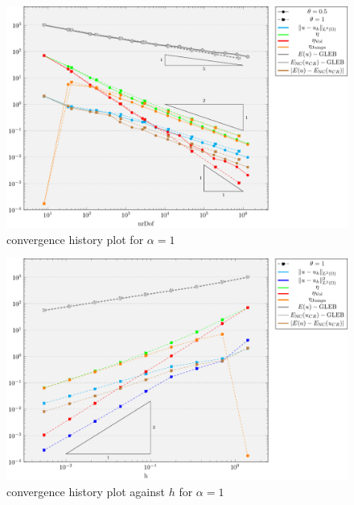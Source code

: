 \documentclass[draft=false,twoside,12pt]{scrreprt}
\begin{document}
\vspace{-\parskip}
\begin{figure}[H]
	\centering
	\includegraphics[width=16.5cm]{tikzPlots/f01/alpha1/convergence.pdf}
  \caption{convergence history plot for $\alpha=1$}
\end{figure}

\vspace{-\parskip}
\begin{figure}[H]
	\centering
	\includegraphics[width=16.5cm]{tikzPlots/f01/alpha1hMax/convergence.pdf}
  \caption{convergence history plot against $h$ for $\alpha=1$}
\end{figure}
\end{document}

